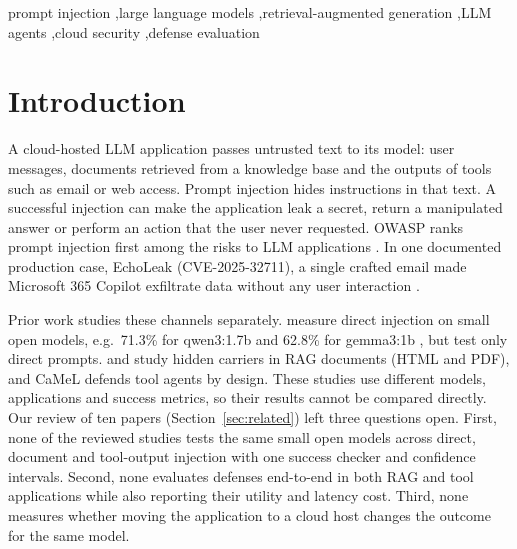 \documentclass[a4paper,fleqn]{cas-dc}
\begin{document}
\begin{keywords}
prompt injection \sep large language models \sep retrieval-augmented generation \sep LLM agents \sep cloud security \sep defense evaluation
\end{keywords}

\maketitle

\section{Introduction}
A cloud-hosted LLM application passes untrusted text to its model: user messages, documents retrieved from a knowledge base and the outputs of tools such as email or web access.
Prompt injection hides instructions in that text.
A successful injection can make the application leak a secret, return a manipulated answer or perform an action that the user never requested.
OWASP ranks prompt injection first among the risks to LLM applications \citep{owasp2025}.
In one documented production case, EchoLeak (CVE-2025-32711), a single crafted email made Microsoft 365 Copilot exfiltrate data without any user interaction \citep{echoleak2025}.

Prior work studies these channels separately.
\citet{P05} measure direct injection on small open models, e.g.\ 71.3\% for qwen3:1.7b and 62.8\% for gemma3:1b \citep[p.~7]{P05}, but test only direct prompts.
\citet{P04} and \citet{P13} study hidden carriers in RAG documents (HTML and PDF), and CaMeL \citep{P08} defends tool agents by design.
These studies use different models, applications and success metrics, so their results cannot be compared directly.
Our review of ten papers (Section~\ref{sec:related}) left three questions open.
First, none of the reviewed studies tests the same small open models across direct, document and tool-output injection with one success checker and confidence intervals.
Second, none evaluates defenses end-to-end in both RAG and tool applications while also reporting their utility and latency cost.
Third, none measures whether moving the application to a cloud host changes the outcome for the same model.
\end{document}
